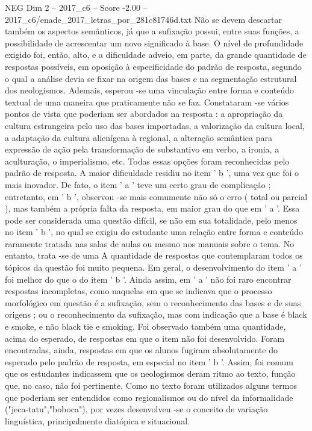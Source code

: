 \begin{textsample}{NEG Dim 2 – 2017\_c6 – Score -2.00 – 2017\_c6/enade\_2017\_letras\_por\_281c81746d.txt}
Não se devem descartar também os aspectos semânticos, já que a sufixação possui, entre suas funções, a possibilidade de acrescentar um novo significado à base.
O nível de profundidade exigido foi, então, alto, e a dificuldade adveio, em parte, da grande quantidade de respostas possíveis, em oposição à especificidade do padrão de resposta, segundo o qual a análise devia se fixar na origem das bases e na segmentação estrutural dos neologismos.
Ademais, esperou -se uma vinculação entre forma e conteúdo textual de uma maneira que praticamente não se faz.
Constataram -se vários pontos de vista que poderiam ser abordados na resposta : a apropriação da cultura estrangeira pelo uso das bases importadas, a valorização da cultura local, a adaptação da cultura alienígena à regional, a alteração semântica para expressão de ação pela transformação de substantivo em verbo, a ironia, a aculturação, o imperialismo, etc.
Todas essas opções foram reconhecidas pelo padrão de resposta.
A maior dificuldade residiu no item ' b ', uma vez que foi o mais inovador.
De fato, o item ' a ' teve um certo grau de complicação ; entretanto, em ' b ', observou -se mais comumente não só o erro ( total ou parcial ), mas também a própria falta da resposta, em maior grau do que em ' a '.
Essa pode ser considerada uma questão difícil, se não em sua totalidade, pelo menos no item ' b ', no qual se exigiu do estudante uma relação entre forma e conteúdo raramente tratada nas salas de aulas ou mesmo nos manuais sobre o tema.
No entanto, trata -se de uma A quantidade de respostas que contemplaram todos os tópicos da questão foi muito pequena.
Em geral, o desenvolvimento do item ' a ' foi melhor do que o do item ' b '.
Ainda assim, em ' a ' não foi raro encontrar respostas incompletas, como naquelas em que se indicava que o processo morfológico em questão é a sufixação, sem o reconhecimento das bases e de suas origens ; ou o reconhecimento da sufixação, mas com indicação que a base é black e smoke, e não black tie e smoking.
Foi observado também uma quantidade, acima do esperado, de respostas em que o item não foi desenvolvido.
Foram encontradas, ainda, respostas em que os alunos fugiram absolutamente do esperado pelo padrão de resposta, em especial no item ' b '.
Assim, foi comum que os estudantes indicassem que os neologismos deram ritmo ao texto, função que, no caso, não foi pertinente.
Como no texto foram utilizados alguns termos que poderiam ser entendidos como regionalismos ou do nível da informalidade ("jeca-tatu","boboca"), por vezes desenvolveu -se o conceito de variação linguística, principalmente diatópica e situacional.

\end{textsample}
